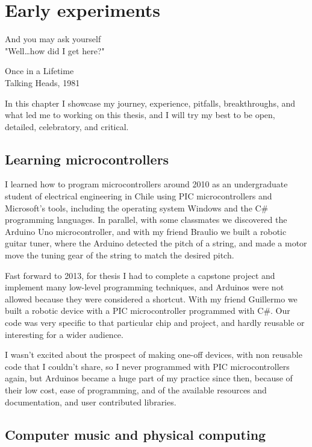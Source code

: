 \chapter{Early experiments}

\epigraph{And you may ask yourself \\ "Well\dots how did I get here?"}{Once in a Lifetime \\ Talking Heads, 1981}

In this chapter I showcase my journey, experience, pitfalls, breakthroughs, and what led me to working on this thesis, and I will try my best to be open, detailed, celebratory, and critical.

\section{Learning microcontrollers}

I learned how to program microcontrollers around 2010 as an undergraduate student of electrical engineering in Chile using PIC microcontrollers and Microsoft's tools, including the operating system Windows and the C\# programming languages. In parallel, with some classmates we discovered the Arduino Uno microcontroller, and with my friend Braulio we built a robotic guitar tuner, where the Arduino detected the pitch of a string, and made a motor move the tuning gear of the string to match the desired pitch.



Fast forward to 2013, for thesis I had to complete a capstone project and implement many low-level programming techniques, and Arduinos were not allowed because they were considered a shortcut. With my friend Guillermo we built a robotic device with a PIC microcontroller programmed with C\#. Our code was very specific to that particular chip and project, and hardly reusable or interesting for a wider audience.

I wasn't excited about the prospect of making one-off devices, with non reusable code that I couldn't share, so I never programmed with PIC microcontrollers again, but Arduinos became a huge part of my practice since then, because of their low cost, ease of programming, and of the available resources and documentation, and user contributed libraries.

\section{Computer music and physical computing}

